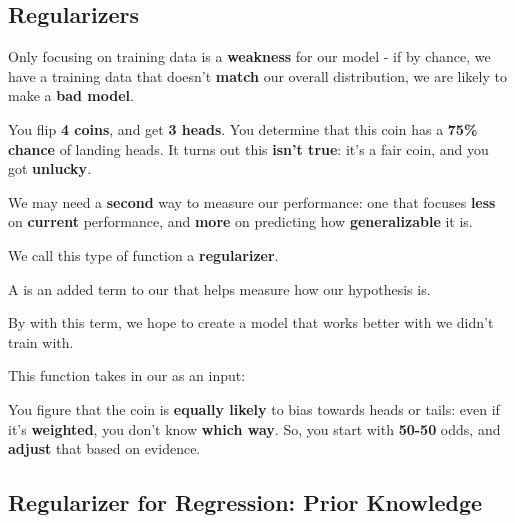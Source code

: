     \subsection{Regularizers}
        
        Only focusing on training data is a \textbf{weakness} for our model - if by chance, we have a training data that doesn't \textbf{match} our overall distribution, we are likely to make a \textbf{bad model}.
        
        \miniex You flip \textbf{4 coins}, and get \textbf{3 heads}. You determine that this coin has a \textbf{75\% chance} of landing heads. It turns out this \textbf{isn't true}: it's a fair coin, and you got \textbf{unlucky}.
        
         We may need a \textbf{second} way to measure our performance: one that focuses \textbf{less} on \textbf{current} performance, and \textbf{more} on predicting how \textbf{generalizable} it is.
        
        We call this type of function a \textbf{regularizer}.\\
        
        \begin{definition}
            A  is an added term to our  that helps measure how  our hypothesis is.
            
            By  with this term, we hope to create a model that works better with  we didn't train with.
            
            This function takes in our  \gren{$\Theta$} as an input: 
        \end{definition}
        
        \miniex You figure that the coin is \textbf{equally likely} to bias towards heads or tails: even if it's \textbf{weighted}, you don't know \textbf{which way}. So, you start with \textbf{50-50} odds, and \textbf{adjust} that based on evidence.
        
    \subsection{Regularizer for Regression: Prior Knowledge}
        
